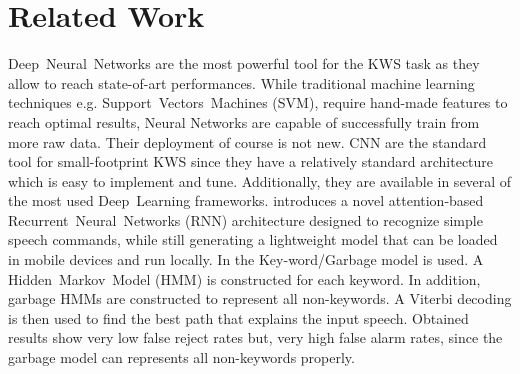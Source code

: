 
\section{Related Work}
\label{sec:related_work}

\noindent 
\mbox{Deep Neural Networks} are the most powerful tool for the KWS task as they allow to reach state-of-art performances. \cite {Jansson-2018} While traditional machine learning techniques e.g. \mbox{Support Vectors Machines} (SVM), require hand-made features to reach optimal results, Neural Networks are capable of successfully train from more raw data. \cite{Tang-2018} Their deployment of course is not new. CNN are the standard tool for small-footprint KWS since they have a relatively standard architecture which is easy to implement and tune. Additionally, they are available in several of the most used \mbox{Deep Learning} frameworks. \cite{Andrade-2018} introduces a novel attention-based \mbox{Recurrent Neural Networks} (RNN) architecture designed to recognize simple speech commands, while still generating a lightweight model that can be loaded in mobile devices and run locally. In \cite{Zang-2018} the \mbox{Key-word/Garbage} model is used. A \mbox{Hidden Markov Model} (HMM) is constructed for each keyword. In addition, garbage HMMs are constructed to represent all non-keywords. A Viterbi decoding is then used to find the best path that explains the input speech. Obtained results show very low false reject rates but, very high false alarm rates, since the garbage model can represents all non-keywords properly.